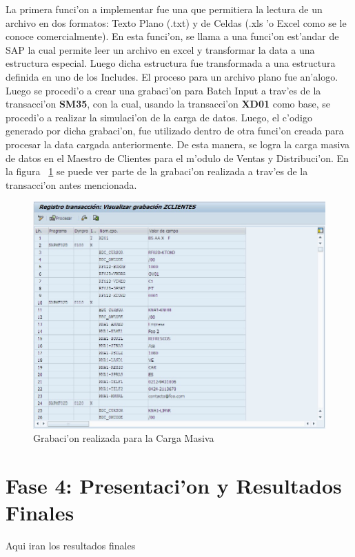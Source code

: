 	La primera funci'on a implementar fue una que permitiera la lectura de un archivo en dos formatos: Texto Plano (.txt) y de Celdas (.xls 'o Excel como se le conoce comercialmente). En esta funci'on, se llama a una funci'on est'andar de SAP la cual permite leer un archivo en excel y transformar la data a una estructura especial. Luego dicha estructura fue transformada a una estructura definida en uno de los Includes. El proceso para un archivo plano fue an'alogo.
	Luego se procedi'o a crear una grabaci'on para Batch Input a trav'es de la transacci'on \textbf{SM35}, con la cual, usando la transacci'on \textbf{XD01} como base, se procedi'o a realizar la simulaci'on de la carga de datos. Luego, el c'odigo generado por dicha grabaci'on, fue utilizado dentro de otra funci'on creada para procesar la data cargada anteriormente. De esta manera, se logra la carga masiva de datos en el Maestro de Clientes para el m'odulo de Ventas y Distribuci'on. En la figura ~\ref{fig:sm35} se puede ver parte de la grabaci'on realizada a trav'es de la transacci'on antes mencionada.
\begin{figure}[H]
\centering
\includegraphics[scale=0.65,type=jpg,ext=.jpg,read=.jpg]{figures/sm35}
\caption{Grabaci'on realizada para la Carga Masiva}
\label{fig:sm35}
\end{figure}

\section{Fase 4: Presentaci'on y Resultados Finales}
Aqui iran los resultados finales